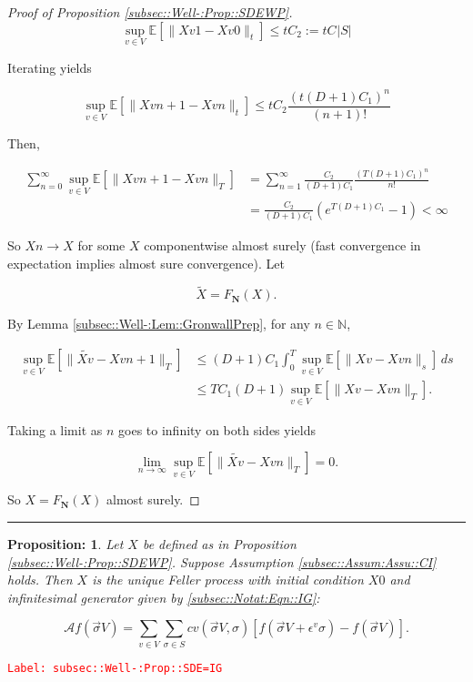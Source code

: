 \documentclass[12pt]{article}
\newcommand{\mb}{\mathbb}
\newcommand{\mc}{\mathcal}
\newcommand{\ra}{\rightarrow}
\newcommand{\ep}{\epsilon}
\newcommand{\tr}{\textcolor{red}}
\newcommand{\labe}[1]{\tr{\texttt{Label: #1}}}
\newcommand{\lin}{\rule{\linewidth}{0.4 pt}}
\newcommand{\ex}[1]{\mb{E}\left[#1\right]}			%
\newcommand{\defeq}{:=}								%
\renewcommand{\v}{v}							%
\renewcommand{\S}{S}							%
\newcommand{\s}{\sigma}							%
\newcommand{\sv}{\vec{\s}}						%
\newcommand{\ev}[1]{\ep^{#1}}					%
\newcommand{\T}{T}								%
\renewcommand{\t}{t}							%
\renewcommand{\tt}{s}							%
\newcommand{\X}{X}								%
\newcommand{\IG}{\mc{A}}						%
\newcommand{\IGr}{c}							%
\newcommand{\degr}{D}								%
\newcommand{\poisses}{\mathbf{N}}				%
\newcommand{\V}{V}									%
\newcommand{\numb}{n}								%
\newcommand{\XState}[1]{\S^{#1}}				%
\newcommand{\const}[1]{C_{#1}}						%
\newcommand{\alt}{\widetilde}						%
\newtheorem{prop}[thms]{Proposition: }
\begin{document}
\begin{proof}[Proof of Proposition \ref{subsec::Well-:Prop::SDEWP}]
\[\sup_{\v \in \V}\ex{\|\X{\v}{}{1} - \X{\v}{}{0}\|_\t} \leq \t\const{2} \defeq \t\const{}|\S|\]

Iterating yields

\[\sup_{\v \in \V} \ex{\|\X{\v}{}{\numb+1} - \X{\v}{}{\numb}\|_\t} \leq \t\const{2}\frac{(\t(\degr+1)\const{1})^\numb}{(\numb+1)!}\]

Then,

\begin{align*}
\sum_{\numb=0}^\infty \sup_{\v \in \V} \ex{\|\X{\v}{}{\numb+1} - \X{\v}{}{\numb}\|_\T} &= \sum_{\numb=1}^\infty \frac{\const{2}}{(\degr+1)\const{1}}\frac{(\T(\degr+1)\const{1})^{\numb}}{\numb !}\\
& = \frac{\const{2}}{(\degr+1)\const{1}}(e^{\T(\degr+1)\const{1}} - 1) < \infty
\end{align*}


So \(\X{}{}{\numb} \ra \X{}{}\) for some \(\X{}{}\) componentwise almost surely (fast convergence in expectation implies almost sure convergence). Let 

\[\alt{\X{}{}} = F_\poisses(\X{}{}).\]

By Lemma \ref{subsec::Well-:Lem::GronwallPrep}, for any \(\numb\in\mb{N}\),

\begin{align*}
\sup_{\v \in \V} \ex{\|\alt{\X{\v}{}} - \X{\v}{}{\numb+1}\|_\T} &\leq (\degr+1)\const{1}\int_0^\T \sup_{\v \in \V}\ex{\|\X{\v}{} - \X{\v}{}{\numb}\|_\tt}\,d\tt \\
&\leq \T\const{1}(\degr+1)\sup_{\v\in \V} \ex{\|\X{\v}{} - \X{\v}{}{\numb}\|_\T}.
\end{align*}

Taking a limit as \(\numb\) goes to infinity on both sides yields

\[\lim_{\numb\ra\infty} \sup_{\v \in \V} \ex{\|\alt{\X{\v}{}} - \X{\v}{}{\numb}\|_\T} = 0.\]

So \(\X{}{}= F_\poisses(\X{}{})\) almost surely.
\end{proof}

\lin

\begin{prop}
Let \(\X{}{}\) be defined as in Proposition \ref{subsec::Well-:Prop::SDEWP}. Suppose Assumption \ref{subsec::Assum:Assu::CI} holds. Then \(\X{}{}\) is the unique Feller process with initial condition \(\X{}{0}\) and infinitesimal generator given by \eqref{subsec::Notat:Eqn::IG}:

\[\IG f(\sv{}{\V}) = \sum_{\v\in \V}\sum_{\s \in \S} \IGr{\v}(\sv{}{\V},\s)[f(\sv{}{\V} + \ev{\v}\s) - f(\sv{}{\V})].\]
\label{subsec::Well-:Prop::SDE=IG}
\end{prop}
\labe{subsec::Well-:Prop::SDE=IG}
\end{document}
